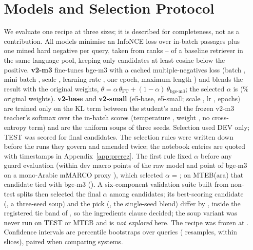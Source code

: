 \documentclass[11pt]{article}
\newcommand{\tabfont}{\footnotesize\setlength{\tabcolsep}{3.2pt}}
\begin{document}
\begin{table}[t]
\centering\tabfont
{}
\caption{Training queries of the v2 recipe before and after the contamination filter.}\label{tab:data}
\end{table}

\section{Models and Selection Protocol}\label{sec:models}
We evaluate one recipe at three sizes; it is described for completeness, not as a contribution.
All models minimise an InfoNCE loss over in-batch passages plus one mined hard negative per query, taken from ranks \NumRankLo--\NumRankHi{} of a baseline retriever in the same language pool, keeping only candidates at least \NumMargin{} cosine below the positive.
\textbf{v2-m3} fine-tunes bge-m3 with a cached multiple-negatives loss \citep{gao2021cachedmnrl} (batch \NumBsM, mini-batch \NumMiniBatch, scale \NumScaleM, learning rate \NumLrM, one epoch, maximum length \NumMaxLenM) and blends the result with the original weights, $\theta=\alpha\,\theta_{\text{FT}}+(1-\alpha)\,\theta_{\text{bge-m3}}$; the selected $\alpha$ is \NumWiseAlpha{} (\NumWiseOriginal\% original weights).
\textbf{v2-base} and \textbf{v2-small} (e5-base, e5-small; scale \NumScaleB, lr \NumLrB, \NumEpochsB{} epochs) are trained only on the KL term between the student's and the frozen v2-m3 teacher's softmax over the in-batch scores (temperature \NumTempB{}, weight \NumKdWeight, no cross-entropy term) and are the uniform soups of three seeds.
Selection used DEV only; TEST was scored for final candidates.
The selection rules were written down before the runs they govern and amended twice; the notebook entries are quoted with timestamps in Appendix~\ref{app:prereg}.
The first rule fixed $\alpha$ before any guard evaluation (within \NumWiseTolDev{} dev macro points of the raw model and \NumWiseTolProxy{} point of bge-m3 on a mono-Arabic mMARCO proxy \citep{bonifacio2021mmarco}), which selected $\alpha$ = \NumWiseAlphaFirst; on MTEB(ara) that candidate tied with bge-m3 (\NumPairedFMeanDiff{}).
A six-component validation suite built from non-test splits then selected the final $\alpha$ among \NumSuitePool{} candidates; its best-scoring candidate (\NumSuiteTopScore, a three-seed soup) and the pick (\NumSuitePickScore, the single-seed blend) differ by \NumSuiteGap{}, inside the registered tie band of \NumSuiteTieBand, so the ingredients clause decided; the soup variant was never run on TEST or MTEB and is \emph{not explored} here.
The recipe was frozen at \NumFrozenAt{}.
Confidence intervals are percentile bootstraps over queries (\NumBootstrap{} resamples, within slices), paired when comparing systems.
\end{document}
